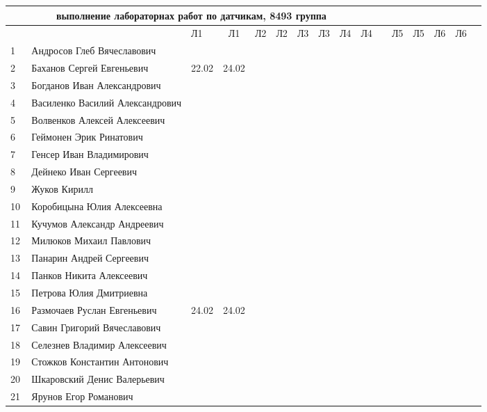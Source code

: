\documentclass[a4paper,landscape,11pt]{article}
\begin{document}
\newpage
%
\begin{tabular}{l|llccccccccccccc}
\multicolumn{10}{c}{выполнение лабораторнах работ по датчикам, 8493 группа} \\
\toprule
&&Л1&Л1& Л2&Л2& Л3&Л3& Л4&Л4& &Л5&Л5& Л6&Л6\\
\midrule
1\,&  Андросов Глеб Вячеславович      &      &      &&&&&&\\
2\,&  Баханов Сергей Евгеньевич       & 22.02& 24.02&&&&&&\\
3\,&  Богданов Иван Александрович     &      &      &&&&&&\\
4\,&  Василенко Василий Александрович &      &      &&&&&&\\
5\,&  Волвенков Алексей Алексеевич    &      &      &&&&&&\\
\midrule                                            
6\,&  Геймонен Эрик Ринатович         &      &      &&&&&&\\
7\,&  Генсер Иван Владимирович        &      &      &&&&&&\\
8\,&  Дейнеко Иван Сергеевич          &      &      &&&&&&\\
9\,&  Жуков Кирилл                    &      &      &&&&&&\\
10\,& Коробицына Юлия Алексеевна      &      &      &&&&&&\\
\midrule                                            
11\,& Кучумов Александр Андреевич     &      &      &&&&&&\\
12\,& Милюков Михаил Павлович         &      &      &&&&&&\\
13\,& Панарин Андрей Сергеевич        &      &      &&&&&&\\
14\,& Панков Никита Алексеевич        &      &      &&&&&&\\
15\,& Петрова Юлия Дмитриевна         &      &      &&&&&&\\
\midrule                                            
16\,& Размочаев Руслан Евгеньевич     & 24.02& 24.02&&&&&&\\
17\,& Савин Григорий Вячеславович     &      &      &&&&&&\\
18\,& Селезнев Владимир Алексеевич    &      &      &&&&&&\\
19\,& Стожков Константин Антонович    &      &      &&&&&&\\
20\,& Шкаровский Денис Валерьевич     &      &      &&&&&&\\
\midrule                                            
21\,& Ярунов Егор Романович           &      &      &&&&&&\\
\bottomrule
\end{tabular}
\end{document}
